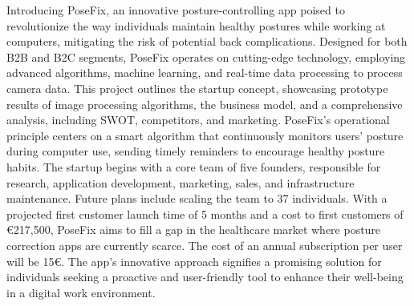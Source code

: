 Introducing PoseFix, an innovative posture-controlling app poised to revolutionize the way individuals maintain healthy postures while working at computers, mitigating the risk of potential back complications. Designed for both B2B and B2C segments, PoseFix operates on cutting-edge technology, employing advanced algorithms, machine learning, and real-time data processing to process camera data.
This project outlines the startup concept, showcasing prototype results of image processing algorithms, the business model, and a comprehensive analysis, including SWOT, competitors, and marketing. PoseFix's operational principle centers on a smart algorithm that continuously monitors users' posture during computer use, sending timely reminders to encourage healthy posture habits.
The startup begins with a core team of five founders, responsible for research, application development, marketing, sales, and infrastructure maintenance. Future plans include scaling the team to 37 individuals. With a projected first customer launch time of 5 months and a cost to first customers of €217,500, PoseFix aims to fill a gap in the healthcare market where posture correction apps are currently scarce. The cost of an annual subscription per user will be 15€. The app's innovative approach signifies a promising solution for individuals seeking a proactive and user-friendly tool to enhance their well-being in a digital work environment.
